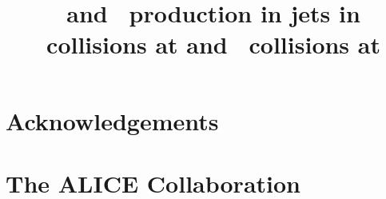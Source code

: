 

\linenumbers

%

\begin{titlepage}
%
\PHdate{\today}  %
%

\title{\lda\ and \ks\ production in jets in \pPb\ collisions at  and \pp\ collisions at }


\begin{abstract}

\end{abstract}
\end{titlepage}
\setcounter{page}{2}

%
%

%
%

\newenvironment{acknowledgement}{\relax}{\relax}
\begin{acknowledgement}
\section*{Acknowledgements}
\end{acknowledgement}



\newpage
\appendix
%
%
\section{The ALICE Collaboration}
\label{app:collab}
